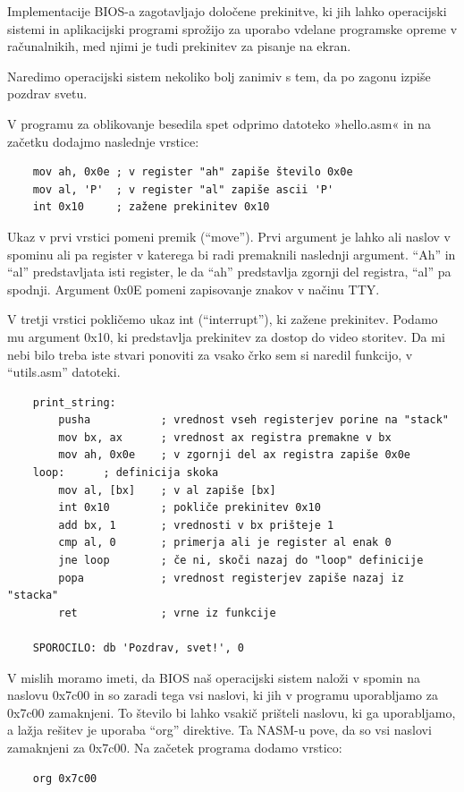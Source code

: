 \documentclass{report}
\begin{document}
Implementacije BIOS-a zagotavljajo določene prekinitve, ki jih lahko operacijski sistemi in aplikacijski programi sprožijo za uporabo vdelane programske opreme v računalnikih, med njimi je tudi prekinitev za pisanje na ekran.

Naredimo operacijski sistem nekoliko bolj zanimiv s tem, da po zagonu izpiše pozdrav svetu.

V programu za oblikovanje besedila spet odprimo datoteko »hello.asm« in na začetku dodajmo naslednje vrstice:
\begin{verbatim}
    mov ah, 0x0e ; v register "ah" zapiše število 0x0e
    mov al, 'P'  ; v register "al" zapiše ascii 'P'
    int 0x10     ; zažene prekinitev 0x10
\end{verbatim}
Ukaz v prvi vrstici pomeni premik (``move''). Prvi argument je lahko ali naslov
v spominu ali pa register v katerega bi radi premaknili naslednji argument.
``Ah'' in ``al'' predstavljata isti register, le da ``ah'' predstavlja zgornji
del registra, ``al'' pa spodnji. Argument 0x0E pomeni zapisovanje znakov v načinu TTY.

V tretji vrstici pokličemo ukaz int (``interrupt''), ki zažene prekinitev.
Podamo mu argument 0x10, ki predstavlja prekinitev za dostop do video storitev.
Da mi nebi bilo treba iste stvari ponoviti za vsako črko sem si naredil
funkcijo, v ``utils.asm'' datoteki.
\begin{verbatim}
    print_string:
        pusha           ; vrednost vseh registerjev porine na "stack"
        mov bx, ax      ; vrednost ax registra premakne v bx
        mov ah, 0x0e    ; v zgornji del ax registra zapiše 0x0e
    loop:      ; definicija skoka
        mov al, [bx]    ; v al zapiše [bx]
        int 0x10        ; pokliče prekinitev 0x10
        add bx, 1       ; vrednosti v bx prišteje 1
        cmp al, 0       ; primerja ali je register al enak 0
        jne loop        ; če ni, skoči nazaj do "loop" definicije
        popa            ; vrednost registerjev zapiše nazaj iz "stacka"
        ret             ; vrne iz funkcije

    SPOROCILO: db 'Pozdrav, svet!', 0
\end{verbatim}
V mislih moramo imeti, da BIOS naš operacijski sistem naloži v spomin na naslovu
0x7c00 in so zaradi tega vsi naslovi, ki jih v programu uporabljamo za 0x7c00
zamaknjeni. To število bi lahko vsakič prišteli naslovu, ki ga uporabljamo, a
lažja rešitev je uporaba ``org'' direktive. Ta NASM-u pove, da so vsi naslovi zamaknjeni za 0x7c00.  Na začetek programa dodamo vrstico:
\begin{verbatim}
    org 0x7c00
\end{verbatim}
\end{document}
